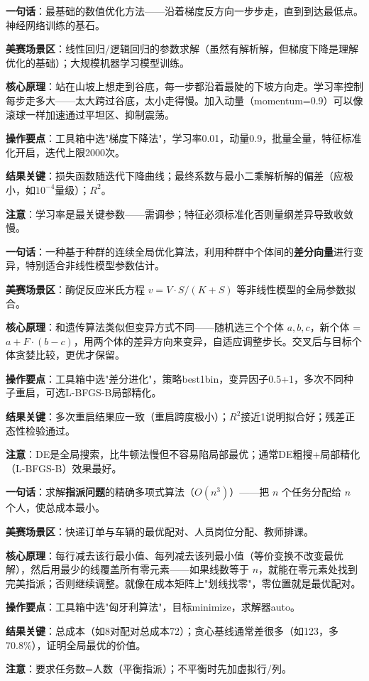 \begin{algobrief}
\textbf{一句话}：最基础的数值优化方法——沿着梯度反方向一步步走，直到到达最低点。神经网络训练的基石。

\textbf{美赛场景区}：线性回归/逻辑回归的参数求解（虽然有解析解，但梯度下降是理解优化的基础）；大规模机器学习模型训练。

\textbf{核心原理}：站在山坡上想走到谷底，每一步都沿着最陡的下坡方向走。学习率控制每步走多大——太大跨过谷底，太小走得慢。加入动量（momentum=0.9）可以像滚球一样加速通过平坦区、抑制震荡。

\textbf{操作要点}：工具箱中选"梯度下降法"，学习率0.01，动量0.9，批量全量，特征标准化开启，迭代上限2000次。

\textbf{结果关键}：损失函数随迭代下降曲线；最终系数与最小二乘解析解的偏差（应极小，如$10^{-4}$量级）；$R^2$。

\textbf{注意}：学习率是最关键参数——需调参；特征必须标准化否则量纲差异导致收敛慢。
\end{algobrief}


\begin{algobrief}
\textbf{一句话}：一种基于种群的连续全局优化算法，利用种群中个体间的\textbf{差分向量}进行变异，特别适合非线性模型参数估计。

\textbf{美赛场景区}：酶促反应米氏方程 $v=V\cdot S/(K+S)$ 等非线性模型的全局参数拟合。

\textbf{核心原理}：和遗传算法类似但变异方式不同——随机选三个个体 $a,b,c$，新个体 = $a + F\cdot(b-c)$，用两个体的差异方向来变异，自适应调整步长。交叉后与目标个体贪婪比较，更优才保留。

\textbf{操作要点}：工具箱中选"差分进化"，策略best1bin，变异因子0.5+1，多次不同种子重启，可选L-BFGS-B局部精化。

\textbf{结果关键}：多次重启结果应一致（重启跨度极小）；$R^2$接近1说明拟合好；残差正态性检验通过。

\textbf{注意}：DE是全局搜索，比牛顿法慢但不容易陷局部最优；通常DE粗搜+局部精化（L-BFGS-B）效果最好。
\end{algobrief}


\begin{algobrief}
\textbf{一句话}：求解\textbf{指派问题}的精确多项式算法（$O(n^3)$）——把 $n$ 个任务分配给 $n$ 个人，使总成本最小。

\textbf{美赛场景区}：快递订单与车辆的最优配对、人员岗位分配、教师排课。

\textbf{核心原理}：每行减去该行最小值、每列减去该列最小值（等价变换不改变最优解），然后用最少的线覆盖所有零元素——如果线数等于 $n$，就能在零元素处找到完美指派；否则继续调整。就像在成本矩阵上"划线找零"，零位置就是最优配对。

\textbf{操作要点}：工具箱中选"匈牙利算法"，目标minimize，求解器auto。

\textbf{结果关键}：总成本（如8对配对总成本72）；贪心基线通常差很多（如123，多70.8\%），证明全局最优的价值。

\textbf{注意}：要求任务数=人数（平衡指派）；不平衡时先加虚拟行/列。
\end{algobrief}

